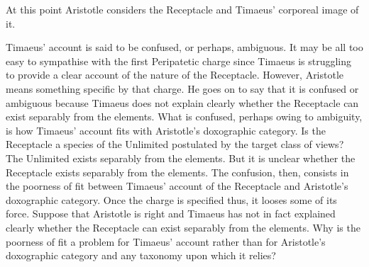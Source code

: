 At this point Aristotle considers the Receptacle and Timaeus' corporeal image of it.

Timaeus' account is said to be confused, or perhaps, ambiguous. It may be all too easy to sympathise with the first Peripatetic charge since Timaeus is struggling to provide a clear account of the nature of the Receptacle. However, Aristotle means something specific by that charge. He goes on to say that it is confused or ambiguous because Timaeus does not explain clearly whether the Receptacle can exist separably from the elements. What is confused, perhaps owing to ambiguity, is how Timaeus' account fits with Aristotle's doxographic category. Is the Receptacle a species of the Unlimited postulated by the target class of views? The Unlimited exists separably from the elements. But it is unclear whether the Receptacle exists separably from the elements. The confusion, then, consists in the poorness of fit between Timaeus' account of the Receptacle and Aristotle's doxographic category. Once the charge is specified thus, it looses some of its force. Suppose that Aristotle is right and Timaeus has not in fact explained clearly whether the Receptacle can exist separably from the elements. Why is the poorness of fit a problem for Timaeus' account rather than for Aristotle's doxographic category and any taxonomy upon which it relies?

